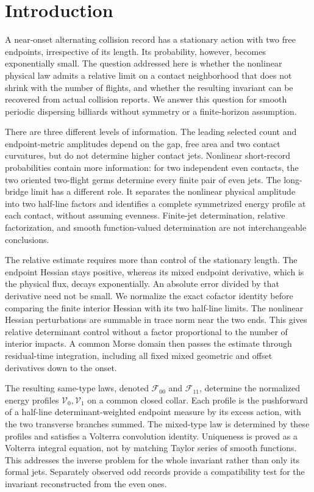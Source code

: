 \section{Introduction}
\label{sec:geometric-results}
A near-onset alternating collision record has a stationary action with
two free endpoints, irrespective of its length. Its probability,
however, becomes exponentially small. The question addressed here is
whether the nonlinear physical law admits a relative limit on a
contact neighborhood that does not shrink with the number of flights,
and whether the resulting invariant can be recovered from actual
collision reports. We answer this question for smooth periodic
dispersing billiards without symmetry or a finite-horizon assumption.

There are three different levels of information. The leading selected
count and endpoint-metric amplitudes depend on the gap, free area and
two contact curvatures, but do not determine higher contact jets.
Nonlinear short-record probabilities contain more information: for two
independent even contacts, the two oriented two-flight germs determine
every finite pair of even jets. The long-bridge limit has a different
role. It separates the nonlinear physical amplitude into two half-line
factors and identifies a complete symmetrized energy profile at each
contact, without assuming evenness. Finite-jet determination, relative
factorization, and smooth function-valued determination are not
interchangeable conclusions.

The relative estimate requires more than control of the stationary
length. The endpoint Hessian stays positive, whereas its mixed
endpoint derivative, which is the physical flux, decays exponentially.
An absolute error divided by that derivative need not be small. We
normalize the exact cofactor identity before comparing the finite
interior Hessian with its two half-line limits. The nonlinear Hessian
perturbations are summable in trace norm near the two ends. This gives
relative determinant control without a factor proportional to the
number of interior impacts. A common Morse domain then passes the
estimate through residual-time integration, including all fixed mixed
geometric and offset derivatives down to the onset.

The resulting same-type laws, denoted $\mathcal F_{00}$ and
$\mathcal F_{11}$, determine the normalized energy profiles
$\mathcal V_0,\mathcal V_1$ on a common closed collar. Each profile
is the pushforward of a half-line determinant-weighted endpoint measure
by its excess action, with the two transverse branches summed.
The mixed-type law is determined by these profiles and satisfies a
Volterra convolution identity. Uniqueness is proved as a Volterra
integral equation, not by matching Taylor series of smooth functions.
This addresses the inverse problem for the whole invariant rather
than only its formal jets. Separately observed odd records provide a
compatibility test for the invariant reconstructed from the even ones.

